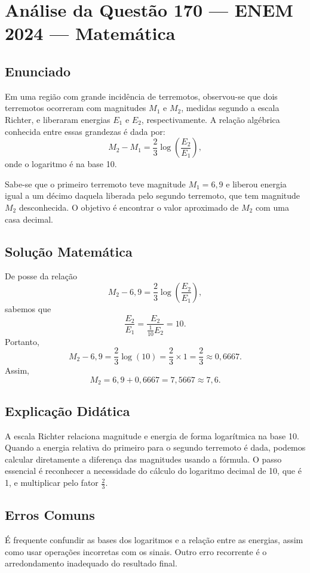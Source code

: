 \documentclass{article}
\begin{document}
\section*{Análise da Questão 170 — ENEM 2024 — Matemática}

\subsection*{Enunciado}
Em uma região com grande incidência de terremotos, observou-se que dois terremotos ocorreram com magnitudes $M_1$ e $M_2$, medidas segundo a escala Richter, e liberaram energias $E_1$ e $E_2$, respectivamente. A relação algébrica conhecida entre essas grandezas é dada por:
\begin{equation}
M_2 - M_1 = \frac{2}{3} \log \left( \frac{E_2}{E_1} \right),
\end{equation}
onde o logaritmo é na base 10.

Sabe-se que o primeiro terremoto teve magnitude $M_1 = 6,9$ e liberou energia igual a um décimo daquela liberada pelo segundo terremoto, que tem magnitude $M_2$ desconhecida. O objetivo é encontrar o valor aproximado de $M_2$ com uma casa decimal.

\subsection*{Solução Matemática}
De posse da relação
\[
M_2 - 6,9 = \frac{2}{3} \log \left( \frac{E_2}{E_1} \right),
\]
sabemos que
\[
\frac{E_2}{E_1} = \frac{E_2}{\frac{1}{10} E_2} = 10.
\]
Portanto,
\[
M_2 - 6,9 = \frac{2}{3} \log (10) = \frac{2}{3} \times 1 = \frac{2}{3} \approx 0,6667.
\]
Assim,
\[
M_2 = 6,9 + 0,6667 = 7,5667 \approx \boxed{7,6}.
\]

\subsection*{Explicação Didática}
A escala Richter relaciona magnitude e energia de forma logarítmica na base 10. Quando a energia relativa do primeiro para o segundo terremoto é dada, podemos calcular diretamente a diferença das magnitudes usando a fórmula. O passo essencial é reconhecer a necessidade do cálculo do logaritmo decimal de 10, que é 1, e multiplicar pelo fator $\frac{2}{3}$.

\subsection*{Erros Comuns}
É frequente confundir as bases dos logaritmos e a relação entre as energias, assim como usar operações incorretas com os sinais. Outro erro recorrente é o arredondamento inadequado do resultado final.
\end{document}
